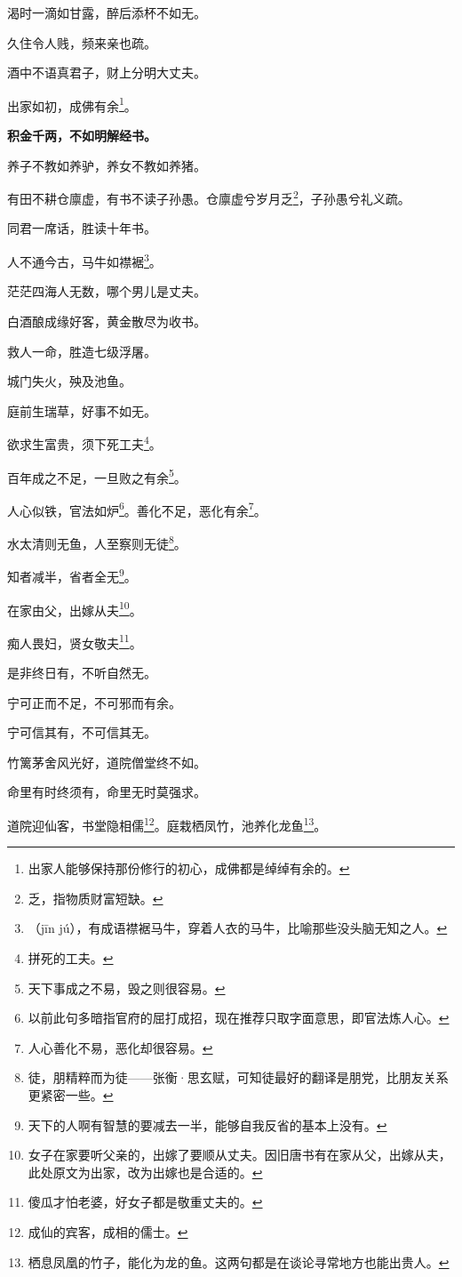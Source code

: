 \documentclass[12pt,oneside]{book}
\begin{document}
渴时一滴如甘露，醉后添杯不如无。

久住令人贱，频来亲也疏。

酒中不语真君子，财上分明大丈夫。

出家如初，成佛有余\footnote{出家人能够保持那份修行的初心，成佛都是绰绰有余的。}。

\textbf{积金千两，不如明解经书。}

养子不教如养驴，养女不教如养猪。

有田不耕仓廪虚，有书不读子孙愚。仓廪虚兮岁月乏\footnote{乏，指物质财富短缺。}，子孙愚兮礼义疏。

同君一席话，胜读十年书。

人不通今古，马牛如襟裾\footnote{（jīn jú），有成语襟裾马牛，穿着人衣的马牛，比喻那些没头脑无知之人。}。

茫茫四海人无数，哪个男儿是丈夫。

白酒酿成缘好客，黄金散尽为收书。

救人一命，胜造七级浮屠。

城门失火，殃及池鱼。

庭前生瑞草，好事不如无。

欲求生富贵，须下死工夫\footnote{拼死的工夫。}。

百年成之不足，一旦败之有余\footnote{天下事成之不易，毁之则很容易。}。

人心似铁，官法如炉\footnote{以前此句多暗指官府的屈打成招，现在推荐只取字面意思，即官法炼人心。}。善化不足，恶化有余\footnote{人心善化不易，恶化却很容易。}。

水太清则无鱼，人至察则无徒\footnote{徒，朋精粹而为徒——张衡·思玄赋，可知徒最好的翻译是朋党，比朋友关系更紧密一些。}。

知者减半，省者全无\footnote{天下的人啊有智慧的要减去一半，能够自我反省的基本上没有。}。

在家由父，出嫁从夫\footnote{女子在家要听父亲的，出嫁了要顺从丈夫。因旧唐书有在家从父，出嫁从夫，此处原文为出家，改为出嫁也是合适的。}。

痴人畏妇，贤女敬夫\footnote{傻瓜才怕老婆，好女子都是敬重丈夫的。}。

是非终日有，不听自然无。

宁可正而不足，不可邪而有余。

宁可信其有，不可信其无。

竹篱茅舍风光好，道院僧堂终不如。

命里有时终须有，命里无时莫强求。

道院迎仙客，书堂隐相儒\footnote{成仙的宾客，成相的儒士。}。庭栽栖凤竹，池养化龙鱼\footnote{栖息凤凰的竹子，能化为龙的鱼。这两句都是在谈论寻常地方也能出贵人。}。
\end{document}
